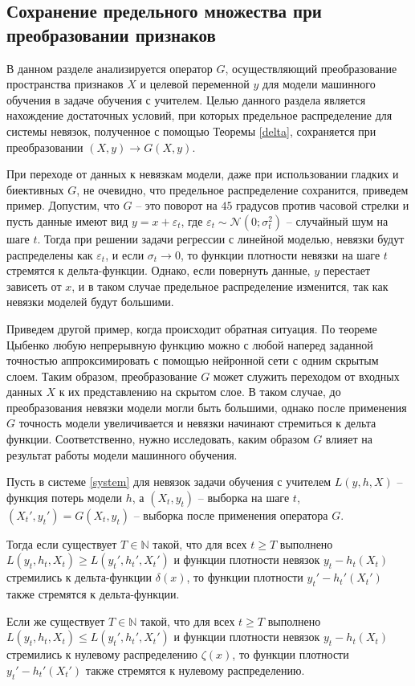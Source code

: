     \subsection{Сохранение предельного множества при преобразовании признаков}

        В данном разделе анализируется оператор $G$, осуществляющий преобразование пространства признаков $X$ и целевой переменной $y$ для модели машинного обучения в задаче обучения с учителем. Целью данного раздела является нахождение достаточных условий, при которых предельное распределение для системы невязок, полученное с помощью Теоремы \ref{delta}, сохраняется при преобразовании $(X, y) \to G(X, y)$. 

        При переходе от данных к невязкам модели, даже при использовании гладких и биективных $G$, не очевидно, что предельное распределение сохранится, приведем пример. Допустим, что $G$ -- это поворот на $45$ градусов против часовой стрелки и пусть данные имеют вид $y = x + \varepsilon_t$, где  $\varepsilon_t \sim \mathcal{N}(0; \sigma_t^2)$ -- случайный шум на шаге $t$. Тогда при решении задачи регрессии с линейной моделью, невязки будут распределены как $\varepsilon_t$, и если $\sigma_t \to 0$, то функции плотности невязки на шаге $t$ стремятся к дельта-функции. Однако, если повернуть данные, $y$ перестает зависеть от $x$, и в таком случае предельное распределение изменится, так как невязки моделей будут большими. 

        Приведем другой пример, когда происходит обратная ситуация. По теореме Цыбенко \cite{cybenko1989approximation} любую непрерывную функцию можно с любой наперед заданной точностью аппроксимировать с помощью нейронной сети с одним скрытым слоем. Таким образом, преобразование $G$ может служить переходом от входных данных $X$ к их представлению на скрытом слое. В таком случае, до преобразования невязки модели могли быть большими, однако после применения $G$ точность модели увеличивается и невязки начинают стремиться к дельта функции. Соответственно, нужно исследовать, каким образом $G$ влияет на результат работы модели машинного обучения.

        \begin{lemma}[Веприков, 2024] \label{loss}
            Пусть в системе \eqref{system} для невязок задачи обучения с учителем $L(y, h, X)$ -- функция потерь модели $h$, а $(X_t, y_t)$ -- выборка на шаге $t$, $(X_t', y_t') = G(X_t, y_t)$ – выборка после применения оператора $G$. 
            
	        Тогда если существует $T \in \mathbb{N}$ такой, что для всех $t \geq T$ выполнено $L(y_t, h_t, X_t) \geq L(y_t', h_t', X_t')$ и функции плотности невязок $y_t - h_t(X_t)$ стремились к дельта-функции $\delta(x)$, то функции плотности $y_t' - h_t'(X_t')$ также стремятся к дельта-функции. 
         
	        Если же существует $T \in \mathbb{N}$ такой, что для всех $t \geq T$ выполнено $L(y_t, h_t, X_t) \leq L(y_t', h_t', X_t')$ и функции плотности невязок $y_t - h_t(X_t)$ стремились к нулевому распределению $\zeta(x)$, то функции плотности $y_t' - h_t'(X_t')$ также стремятся к нулевому распределению. 
        \end{lemma}

